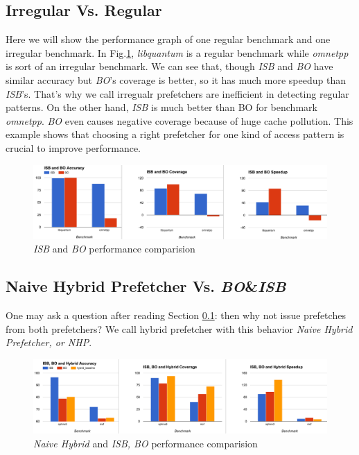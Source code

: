   \subsection{Irregular Vs. Regular}
  \label{sec:irrVsre}
  Here we will show the performance graph of one regular benchmark and one irregular benchmark. In Fig.\ref{fig:regVsirreg}, \emph{libquantum} is a regular benchmark while \emph{omnetpp} is sort of an irregular benchmark. We can see that, though \emph{ISB} and \emph{BO} have similar accuracy but \emph{BO}'s coverage is better, so it has much more speedup than \emph{ISB}'s. That's why we call irregualr prefetchers are inefficient in detecting regular patterns. On the other hand, \emph{ISB} is much better than BO for benchmark \emph{omnetpp}. \emph{BO} even causes negative coverage because of huge cache pollution. This example shows that choosing a right prefetcher for one kind of access pattern is crucial to improve performance.
  \begin{figure}[ht!]
	  \centering
	  \includegraphics[width=1.0\textwidth]{images/isbvsbo.png}
	  \caption{\emph{ISB} and \emph{BO} performance comparision}
	  \label{fig:regVsirreg}
  \end{figure}


  \subsection{Naive Hybrid Prefetcher Vs. \emph{BO}\&\emph{ISB}}
  \label{sec:naivehy}
  One may ask a question after reading Section \ref{sec:irrVsre}: then why not issue prefetches from both prefetchers? We call hybrid prefetcher with this behavior \emph{Naive Hybrid Prefetcher, or NHP}.
  \begin{figure}[ht!]
	  \centering
	  \includegraphics[width=1.0\textwidth]{images/hybridVssingle.png}
	  \caption{\emph{Naive Hybrid} and \emph{ISB, BO} performance comparision}
	  \label{fig:hybridVssingle}
  \end{figure}


